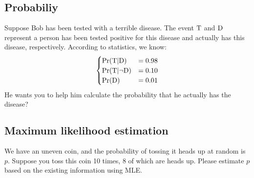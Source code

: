 \documentclass{article}
\begin{document}
    \subsection{Probabiliy}
        Suppose Bob has been tested with a terrible disease. 
        The event $\mathrm{T}$ and $\mathrm{D}$ represent a person has been tested positive for this disease and actually has this disease, respectively. 
        According to statistics, we know:
        \begin{equation}
            \begin{cases}
                \Pr(\mathrm{T} | \mathrm{D}) &= 0.98\\
                \Pr(\mathrm{T} | \lnot \mathrm{D}) &= 0.10\\
                \Pr(\mathrm{D}) &= 0.01
            \end{cases}
        \end{equation}
        He wants you to help him calculate the probability that he actually has the disease?
    
    \subsection{Maximum likelihood estimation}
    We have an uneven coin, and the probability of tossing it heads up at random is $p$. 
    Suppose you toss this coin 10 times, 8 of which are heads up. 
    Please estimate $p$ based on the existing information using MLE.
    
\end{document}
